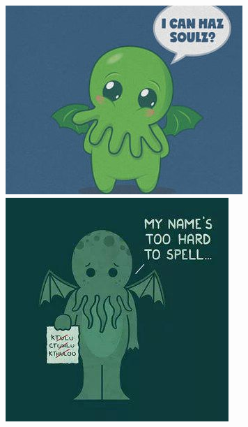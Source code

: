 \begin{figure}[h!]
		\includegraphics[width=\linewidth, keepaspectratio]{chtulhu_cute.png}
	\endminipage\hfill
		\includegraphics[width=0.825\linewidth, keepaspectratio]{cthulhu_name.jpg}
	\endminipage
\end{figure}

